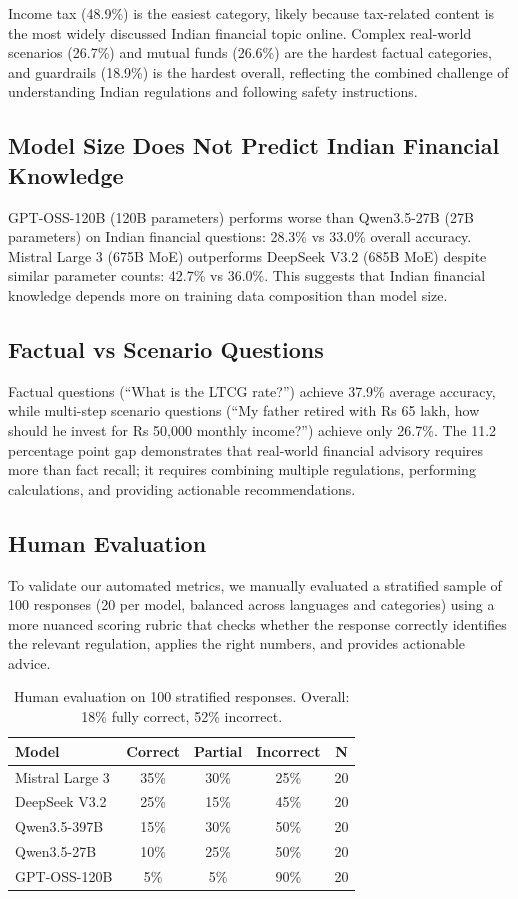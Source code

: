 Income tax (48.9\%) is the easiest category, likely because tax-related content is the most widely discussed Indian financial topic online. Complex real-world scenarios (26.7\%) and mutual funds (26.6\%) are the hardest factual categories, and guardrails (18.9\%) is the hardest overall, reflecting the combined challenge of understanding Indian regulations and following safety instructions.

\subsection{Model Size Does Not Predict Indian Financial Knowledge}

GPT-OSS-120B (120B parameters) performs worse than Qwen3.5-27B (27B parameters) on Indian financial questions: 28.3\% vs 33.0\% overall accuracy. Mistral Large 3 (675B MoE) outperforms DeepSeek V3.2 (685B MoE) despite similar parameter counts: 42.7\% vs 36.0\%. This suggests that Indian financial knowledge depends more on training data composition than model size.

\subsection{Factual vs Scenario Questions}

Factual questions (``What is the LTCG rate?'') achieve 37.9\% average accuracy, while multi-step scenario questions (``My father retired with Rs 65 lakh, how should he invest for Rs 50,000 monthly income?'') achieve only 26.7\%. The 11.2 percentage point gap demonstrates that real-world financial advisory requires more than fact recall; it requires combining multiple regulations, performing calculations, and providing actionable recommendations.


\subsection{Human Evaluation}

To validate our automated metrics, we manually evaluated a stratified sample of 100 responses (20 per model, balanced across languages and categories) using a more nuanced scoring rubric that checks whether the response correctly identifies the relevant regulation, applies the right numbers, and provides actionable advice.

\begin{table}[h]
\centering
\begin{tabular}{lcccc}
\toprule
Model & Correct & Partial & Incorrect & N \\
\midrule
Mistral Large 3 & 35\% & 30\% & 25\% & 20 \\
DeepSeek V3.2 & 25\% & 15\% & 45\% & 20 \\
Qwen3.5-397B & 15\% & 30\% & 50\% & 20 \\
Qwen3.5-27B & 10\% & 25\% & 50\% & 20 \\
GPT-OSS-120B & 5\% & 5\% & 90\% & 20 \\
\bottomrule
\end{tabular}
\caption{Human evaluation on 100 stratified responses. Overall: 18\% fully correct, 52\% incorrect.}
\end{table}

